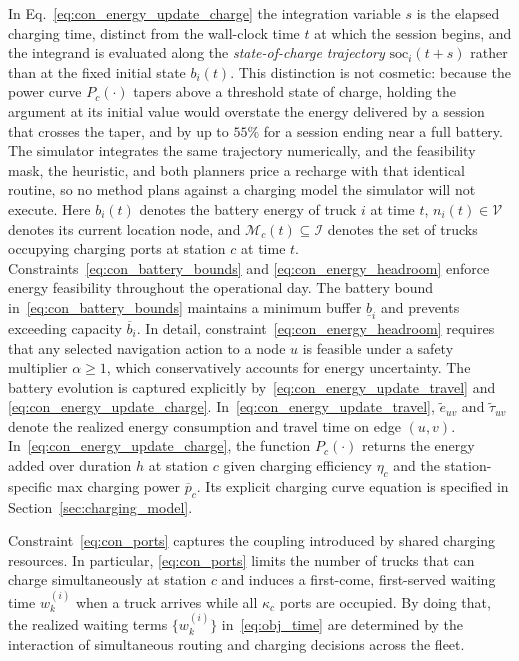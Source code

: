 \documentclass[a4paper,fleqn]{cas-sc}
\begin{document}
In Eq.~\eqref{eq:con_energy_update_charge} the integration variable $s$ is the elapsed charging time, distinct from the wall-clock time $t$ at which the session begins, and the integrand is evaluated along the \emph{state-of-charge trajectory} $\mathrm{soc}_i(t+s)$ rather than at the fixed initial state $b_i(t)$. This distinction is not cosmetic: because the power curve $P_c(\cdot)$ tapers above a threshold state of charge, holding the argument at its initial value would overstate the energy delivered by a session that crosses the taper, and by up to $55\%$ for a session ending near a full battery. The simulator integrates the same trajectory numerically, and the feasibility mask, the heuristic, and both planners price a recharge with that identical routine, so no method plans against a charging model the simulator will not execute.
Here $b_i(t)$ denotes the battery energy of truck $i$ at time $t$, $n_i(t)\in\mathcal{V}$ denotes its current location node, and $\mathcal{M}_c(t)\subseteq\mathcal{I}$ denotes the set of trucks occupying charging ports at station $c$ at time $t$. 
Constraints~\eqref{eq:con_battery_bounds} and \eqref{eq:con_energy_headroom} enforce energy feasibility throughout the operational day. The battery bound in~\eqref{eq:con_battery_bounds} maintains a minimum buffer $\underline b_i$ and prevents exceeding capacity $\overline{b}_i$. In detail, constraint~\eqref{eq:con_energy_headroom} requires that any selected navigation action to a node $u$ is feasible under a safety multiplier $\alpha\ge 1$, which conservatively accounts for energy uncertainty. 
The battery evolution is captured explicitly by~\eqref{eq:con_energy_update_travel} and \eqref{eq:con_energy_update_charge}.
In~\eqref{eq:con_energy_update_travel}, $\tilde{e}_{uv}$ and $\tilde{\tau}_{uv}$ denote the realized energy consumption and travel time on edge $(u,v)$. In~\eqref{eq:con_energy_update_charge}, the function $P_c(\cdot)$ returns the energy added over duration $h$ at station $c$ given charging efficiency $\eta_c$ and the station-specific max charging power $\overline{p}_c$. Its explicit charging curve equation is specified in Section~\ref{sec:charging_model}.

Constraint~\eqref{eq:con_ports} captures the coupling introduced by shared charging resources. In particular, \eqref{eq:con_ports} limits the number of trucks that can charge simultaneously at station $c$ and induces a first-come, first-served waiting time $w_k^{(i)}$ when a truck arrives while all $\kappa_c$ ports are occupied. 
By doing that, the realized waiting terms $\{w_k^{(i)}\}$ in~\eqref{eq:obj_time} are determined by the interaction of simultaneous routing and charging decisions across the fleet.
\end{document}
